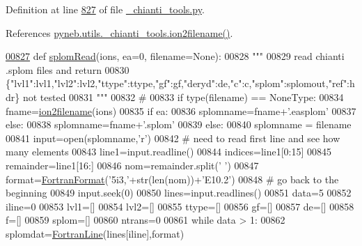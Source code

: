 Definition at line \hyperlink{__chianti__tools_8py_source_l00827}{827} of file \hyperlink{__chianti__tools_8py_source}{\+\_\+chianti\+\_\+tools.\+py}.



References \hyperlink{__chianti__tools_8py_source_l00396}{pyneb.\+utils.\+\_\+chianti\+\_\+tools.\+ion2filename()}.


\begin{DoxyCode}
\hypertarget{namespacepyneb_1_1utils_1_1__chianti__tools_l00827}{}\hyperlink{namespacepyneb_1_1utils_1_1__chianti__tools_a8013cd9bdbf2f8ec5a5ac06e25b0e3a4}{00827} \textcolor{keyword}{def }\hyperlink{namespacepyneb_1_1utils_1_1__chianti__tools_a8013cd9bdbf2f8ec5a5ac06e25b0e3a4}{splomRead}(ions, ea=0, filename=None):
00828     \textcolor{stringliteral}{"""}
00829 \textcolor{stringliteral}{    read chianti .splom files and return}
00830 \textcolor{stringliteral}{    \{"lvl1":lvl1,"lvl2":lvl2,"ttype":ttype,"gf":gf,"deryd":de,"c":c,"splom":splomout,"ref":hdr\} not tested}
00831 \textcolor{stringliteral}{    """}
00832     \textcolor{comment}{#}
00833     \textcolor{keywordflow}{if} type(filename) == NoneType:
00834         fname=\hyperlink{namespacepyneb_1_1utils_1_1__chianti__tools_ad4bc7b577fd4c3819ceb00b0a444351b}{ion2filename}(ions)
00835         \textcolor{keywordflow}{if} ea:
00836             splomname=fname+\textcolor{stringliteral}{'.easplom'}
00837         \textcolor{keywordflow}{else}:
00838             splomname=fname+\textcolor{stringliteral}{'.splom'}
00839     \textcolor{keywordflow}{else}:
00840         splomname = filename
00841     input=open(splomname,\textcolor{stringliteral}{'}\textcolor{stringliteral}{r')}
00842 \textcolor{stringliteral}{    }\textcolor{comment}{#  need to read first line and see how many elements}
00843     line1=input.readline()
00844     indices=line1[0:15]
00845     remainder=line1[16:]
00846     nom=remainder.split(\textcolor{stringliteral}{' '})
00847     format=\hyperlink{classpyneb_1_1utils_1_1_fortran_format_1_1_fortran_format}{FortranFormat}(\textcolor{stringliteral}{'5i3,'}+str(len(nom))+\textcolor{stringliteral}{'E10.2'})
00848     \textcolor{comment}{#  go back to the beginning}
00849     input.seek(0)
00850     lines=input.readlines()
00851     data=5
00852     iline=0
00853     lvl1=[]
00854     lvl2=[]
00855     ttype=[]
00856     gf=[]
00857     de=[]
00858     f=[]
00859     splom=[]
00860     ntrans=0
00861     \textcolor{keywordflow}{while} data > 1:
00862         splomdat=\hyperlink{classpyneb_1_1utils_1_1_fortran_format_1_1_fortran_line}{FortranLine}(lines[iline],format)

\end{DoxyCode}
